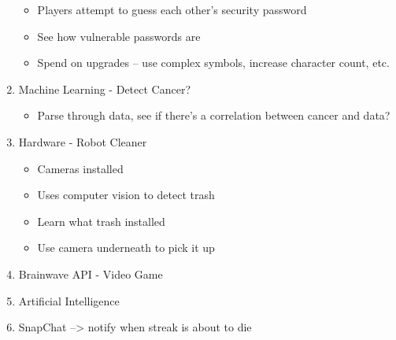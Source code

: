 \documentclass[10pt]{article}
\begin{document}
\begin{enumerate}
    \begin{itemize}
        \item Players attempt to guess each other's security password
        \item See how vulnerable passwords are
        \item Spend on upgrades -- use complex symbols, increase character count, etc.
    \end{itemize}
    \item Machine Learning - Detect Cancer?
    \begin{itemize}
        \item Parse through data, see if there's a correlation between cancer and data?
    \end{itemize}
    \item Hardware - Robot Cleaner
    \begin{itemize}
        \item Cameras installed
        \item Uses computer vision to detect trash
        \item Learn what trash installed
        \item Use camera underneath to pick it up
    \end{itemize}
    \item Brainwave API - Video Game
    \item Artificial Intelligence
    \item SnapChat --> notify when streak is about to die
\end{enumerate}
\end{document}
